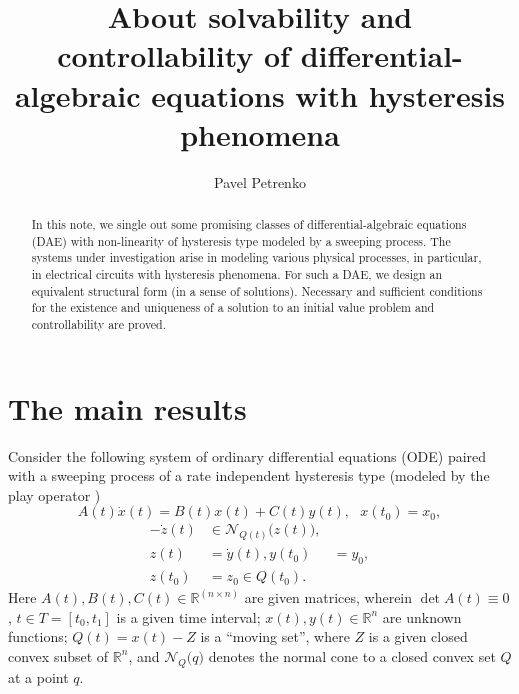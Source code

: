 \documentclass[12pt]{llncs}
\begin{document}
\fi

\title{About solvability and controllability of differential-algebraic equations with hysteresis phenomena}%

\author{Pavel Petrenko
}

\maketitle

\begin{abstract}
In this note, we single out some promising classes of differential-algebraic equations (DAE) with non-linearity of hysteresis type modeled by a sweeping process. The systems under investigation arise in modeling various physical processes, in particular, in electrical circuits with hysteresis phenomena. For such a DAE, we design an equivalent structural form (in a sense of solutions). Necessary and sufficient conditions for the existence and uniqueness of a solution to an initial value problem and controllability are proved.

\end{abstract}


\section{The main results} %


Consider the following system of ordinary differential equations (ODE) paired with a sweeping process \cite{KM2000,Moreau1977} of a rate independent hysteresis type (modeled by the play operator \cite{BS1996,Kr1991,PSS2020})
\begin{equation} \label{pss1}
	A(t)\dot{x}(t)=B(t)x(t)+C(t)y(t), \ \ \ x(t_0)=x_0,
\end{equation}
\begin{equation}\label{pss2}
  \begin{aligned}
	-\dot{z}(t)&\in \mathcal{N}_{Q(t)}\big(z(t)\big),  \\ z(t) &= \dot{y}(t),
	{y}(t_0)&=y_0, \\ z(t_0)&=z_0\in Q(t_0).
  \end{aligned}
\end{equation}
Here $A(t), B(t), C(t) \in \mathbb R^{(n\times n)}$ are given matrices, wherein $\det A(t) \equiv 0$, $t \in T=[t_0,t_1]$ is a given time interval; $x(t), y(t) \in {\mathbb R}^n$ are unknown functions; $Q(t)=x(t)-Z$ is a ``moving set'', where $Z$ is a given closed convex subset of ${\mathbb R}^n$, and $\mathcal{N}_{Q}\big(q\big)$ denotes the normal cone to a closed convex set $Q$ at a point $q$.
\end{document}
